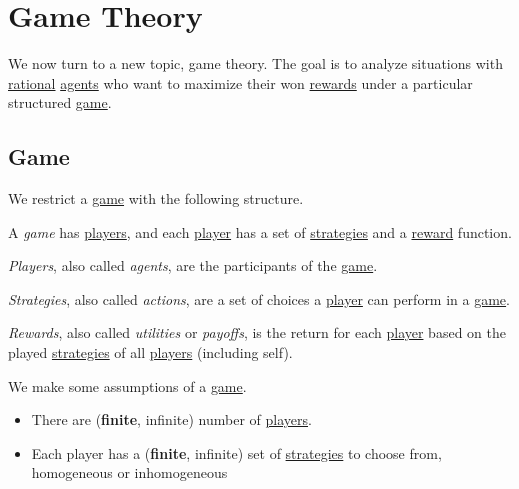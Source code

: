 \chapter{Game Theory}\label{ch:game-theory}
We now turn to a new topic, game theory. The goal is to analyze situations with \hyperref[rationality]{rational} \hyperref[def:player]{agents} who want to maximize their won \hyperref[def:reward]{rewards} under a particular structured \hyperref[def:game]{game}.

\section{Game}
We restrict a \hyperref[def:game]{game} with the following structure.
\begin{definition}[Game]\label{def:game}
	A \emph{game} has \hyperref[def:player]{players}, and each \hyperref[def:player]{player} has a set of \hyperref[def:strategy]{strategies} and a \hyperref[def:reward]{reward} function.

	\begin{definition}[Player]\label{def:player}
		\emph{Players}, also called \emph{agents}, are the participants of the \hyperref[def:game]{game}.
	\end{definition}

	\begin{definition}[Strategy]\label{def:strategy}
		\emph{Strategies}, also called \emph{actions}, are a set of choices a \hyperref[def:player]{player} can perform in a \hyperref[def:game]{game}.
	\end{definition}

	\begin{definition}[Reward]\label{def:reward}
		\emph{Rewards}, also called \emph{utilities} or \emph{payoffs}, is the return for each \hyperref[def:player]{player} based on the played
		\hyperref[def:strategy]{strategies} of all \hyperref[def:player]{players} (including self).
	\end{definition}
\end{definition}
\begin{note}
	We make some assumptions of a \hyperref[def:game]{game}.
	\begin{itemize}
		\item There are (\textbf{finite}, infinite) number of \hyperref[def:player]{players}.
		\item Each player has a (\textbf{finite}, infinite) set of \hyperref[def:strategy]{strategies} to choose from, homogeneous or inhomogeneous
	\end{itemize}
\end{note}

